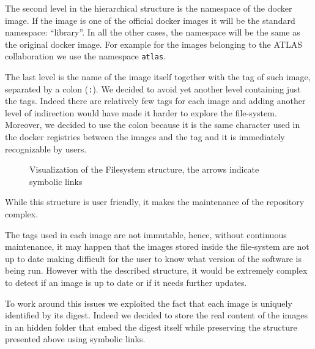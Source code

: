 The second level in the hierarchical structure is the namespace of the docker
image.  If the image is one of the official docker images it will be the
standard namespace: “library”.  In all the other cases, the namespace will be
the same as the original docker image.  For example for the images belonging to
the ATLAS collaboration we use the namespace \texttt{atlas}.

The last level is the name of the image itself together with the tag of such
image, separated by a colon (\texttt{:}).  We decided to avoid yet another
level containing just the tags.  Indeed there are relatively few tags for each
image and adding another level of indirection would have made it harder to
explore the file-system.  Moreover, we decided to use the colon because it is
the same character used in the docker registries between the images and the tag
and it is immediately recognizable by users.

\begin{figure}
\caption{Visualization of the Filesystem structure, the arrows indicate symbolic links}
\label{fig:simple-fs}
\end{figure}

While this structure is user friendly, it makes the maintenance of the
repository complex.

The tags used in each image are not immutable, hence, without continuous
maintenance, it may happen that the images stored inside the file-system are
not up to date making difficult for the user to know what version of the
software is being run.  However with the described structure, it would be
extremely complex to detect if an image is up to date or if it needs further
updates.

To work around this issues we exploited the fact that each image is uniquely
identified by its digest.  Indeed we decided to store the real content of the
images in an hidden folder that embed the digest itself while preserving the
structure presented above using symbolic links.

